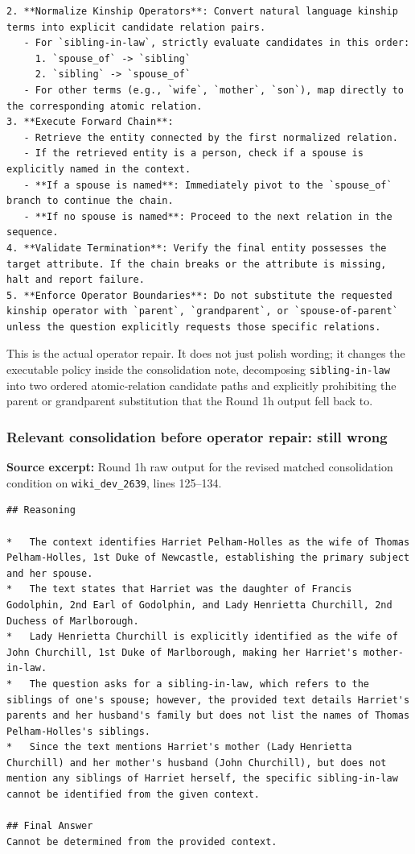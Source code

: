 \begin{lstlisting}
2. **Normalize Kinship Operators**: Convert natural language kinship terms into explicit candidate relation pairs.
   - For `sibling-in-law`, strictly evaluate candidates in this order:
     1. `spouse_of` -> `sibling`
     2. `sibling` -> `spouse_of`
   - For other terms (e.g., `wife`, `mother`, `son`), map directly to the corresponding atomic relation.
3. **Execute Forward Chain**:
   - Retrieve the entity connected by the first normalized relation.
   - If the retrieved entity is a person, check if a spouse is explicitly named in the context.
   - **If a spouse is named**: Immediately pivot to the `spouse_of` branch to continue the chain.
   - **If no spouse is named**: Proceed to the next relation in the sequence.
4. **Validate Termination**: Verify the final entity possesses the target attribute. If the chain breaks or the attribute is missing, halt and report failure.
5. **Enforce Operator Boundaries**: Do not substitute the requested kinship operator with `parent`, `grandparent`, or `spouse-of-parent` unless the question explicitly requests those specific relations.
\end{lstlisting}

This is the actual operator repair. It does not just polish wording; it changes the executable policy inside the consolidation note, decomposing \texttt{sibling-in-law} into two ordered atomic-relation candidate paths and explicitly prohibiting the parent or grandparent substitution that the Round 1h output fell back to.

\subsubsection{Relevant consolidation before operator repair: still wrong}

\textbf{Source excerpt:} Round 1h raw output for the revised matched consolidation condition on \texttt{wiki\_dev\_2639}, lines 125--134.

\begin{lstlisting}
## Reasoning

*   The context identifies Harriet Pelham-Holles as the wife of Thomas Pelham-Holles, 1st Duke of Newcastle, establishing the primary subject and her spouse.
*   The text states that Harriet was the daughter of Francis Godolphin, 2nd Earl of Godolphin, and Lady Henrietta Churchill, 2nd Duchess of Marlborough.
*   Lady Henrietta Churchill is explicitly identified as the wife of John Churchill, 1st Duke of Marlborough, making her Harriet's mother-in-law.
*   The question asks for a sibling-in-law, which refers to the siblings of one's spouse; however, the provided text details Harriet's parents and her husband's family but does not list the names of Thomas Pelham-Holles's siblings.
*   Since the text mentions Harriet's mother (Lady Henrietta Churchill) and her mother's husband (John Churchill), but does not mention any siblings of Harriet herself, the specific sibling-in-law cannot be identified from the given context.

## Final Answer
Cannot be determined from the provided context.
\end{lstlisting}

